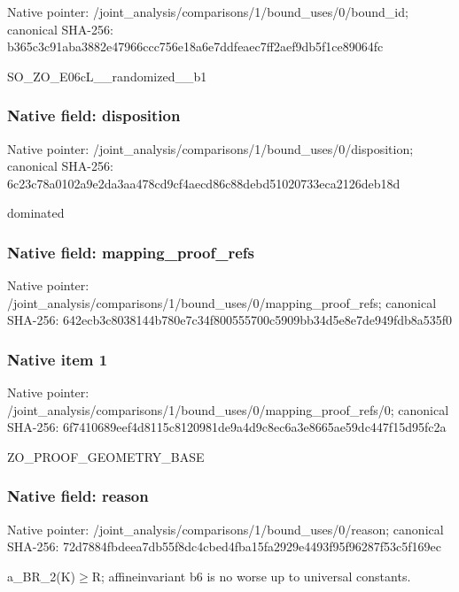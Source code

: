 \documentclass[10pt,a4paper]{article}
\begin{document}
Native pointer: /joint\_analysis/comparis\allowbreak{}ons/1/bound\_uses/0/bound\allowbreak{}\_id; canonical SHA-256: b365c3c91aba3882e47966cc\allowbreak{}c756e18a6e7ddfeaec7ff2ae\allowbreak{}f9db5f1ce89064fc


SO\_ZO\_E06cL\_\_randomized\_\_b1


\subsubsection{Native field: disposition}


Native pointer: /joint\_analysis/comparis\allowbreak{}ons/1/bound\_uses/0/dispo\allowbreak{}sition; canonical SHA-256: 6c23c78a0102a9e2da3aa478\allowbreak{}cd9cf4aecd86c88debd51020\allowbreak{}733eca2126deb18d


dominated


\subsubsection{Native field: mapping\_proof\_refs}


Native pointer: /joint\_analysis/comparis\allowbreak{}ons/1/bound\_uses/0/mappi\allowbreak{}ng\_proof\_refs; canonical SHA-256: 642ecb3c8038144b780e7c34\allowbreak{}f800555700c5909bb34d5e8e\allowbreak{}7de949fdb8a535f0



\subsubsection{Native item 1}


Native pointer: /joint\_analysis/comparis\allowbreak{}ons/1/bound\_uses/0/mappi\allowbreak{}ng\_proof\_refs/0; canonical SHA-256: 6f7410689eef4d8115c81209\allowbreak{}81de9a4d9c8ec6a3e8665ae5\allowbreak{}9dc447f15d95fc2a


ZO\_PROOF\_GEOMETRY\_BASE


\subsubsection{Native field: reason}


Native pointer: /joint\_analysis/comparis\allowbreak{}ons/1/bound\_uses/0/reaso\allowbreak{}n; canonical SHA-256: 72d7884fbdeea7db55f8dc4c\allowbreak{}bed4fba15fa2929e4493f95f\allowbreak{}96287f53c5f169ec


a\_BR\_2(K)\ensuremath{\ge}R; affineinvariant b6 is no worse up to universal constants.
\end{document}
